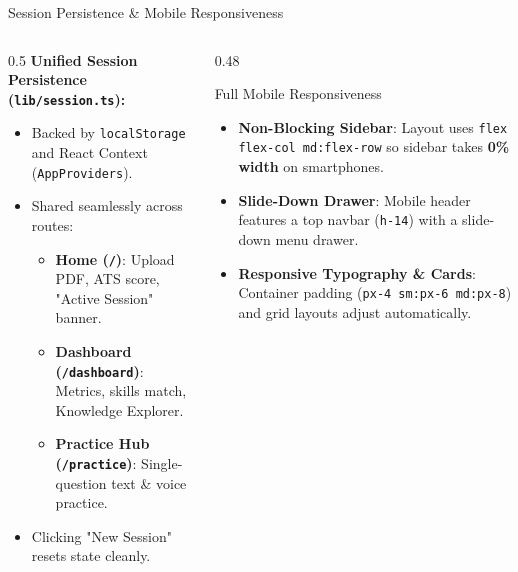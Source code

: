\documentclass[aspectratio=169, 10pt]{beamer}
\begin{document}
\begin{frame}{Session Persistence \& Mobile Responsiveness}
  \begin{columns}
    \begin{column}{0.5\textwidth}
      \textbf{Unified Session Persistence (\texttt{lib/session.ts}):}
      \begin{itemize}
        \item Backed by \texttt{localStorage} and React Context (\texttt{AppProviders}).
        \item Shared seamlessly across routes:
          \begin{itemize}
            \item \textbf{Home (\texttt{/})}: Upload PDF, ATS score, "Active Session" banner.
            \item \textbf{Dashboard (\texttt{/dashboard})}: Metrics, skills match, Knowledge Explorer.
            \item \textbf{Practice Hub (\texttt{/practice})}: Single-question text & voice practice.
          \end{itemize}
        \item Clicking "New Session" resets state cleanly.
      \end{itemize}
    \end{column}

    \begin{column}{0.48\textwidth}
      \begin{block}{Full Mobile Responsiveness}
        \small
        \begin{itemize}
          \item \textbf{Non-Blocking Sidebar}: Layout uses \texttt{flex flex-col md:flex-row} so sidebar takes \textbf{0\% width} on smartphones.
          \item \textbf{Slide-Down Drawer}: Mobile header features a top navbar (\texttt{h-14}) with a slide-down menu drawer.
          \item \textbf{Responsive Typography \& Cards}: Container padding (\texttt{px-4 sm:px-6 md:px-8}) and grid layouts adjust automatically.
        \end{itemize}
      \end{block}
    \end{column}
  \end{columns}
\end{frame}
\end{document}
